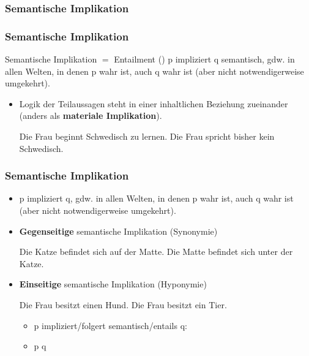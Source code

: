 %
\subsubsection{Semantische Implikation}
%

\begin{frame}
\frametitle{Semantische Implikation}

\begin{block}{Semantische Implikation  $=$ Entailment (\ent)}
 p impliziert q semantisch, gdw. in allen Welten, in denen p wahr ist, auch q wahr ist (aber nicht notwendigerweise umgekehrt).
\end{block}


\begin{itemize}

	\item Logik der Teilaussagen steht in einer inhaltlichen Beziehung zueinander (anders als \textbf{materiale Implikation}).


\eal
	\ex Die Frau beginnt Schwedisch zu lernen.
	\ex Die Frau spricht bisher kein Schwedisch.
\zl

\end{itemize}

\end{frame}



\begin{frame}
\frametitle{Semantische Implikation}

\begin{itemize}
	\item p impliziert q, gdw. in allen Welten, in denen p wahr ist, auch q wahr ist (aber nicht notwendigerweise umgekehrt).
	\medskip
	\item \textbf{Gegenseitige} semantische Implikation (\ras Synonymie)
	
	\eal
		\ex Die Katze befindet sich auf der Matte.
		\ex Die Matte befindet sich unter der Katze.
	\zl
	
	\item \textbf{Einseitige} semantische Implikation (\ras Hyponymie)
	
	
	\eal
		\ex Die Frau besitzt einen Hund.
		\ex Die Frau besitzt ein Tier.
	\zl
	
	\begin{itemize}
		\item p impliziert/folgert semantisch/entails q:
		\item p \ent  q
	\end{itemize}
	
\end{itemize}

\end{frame}


